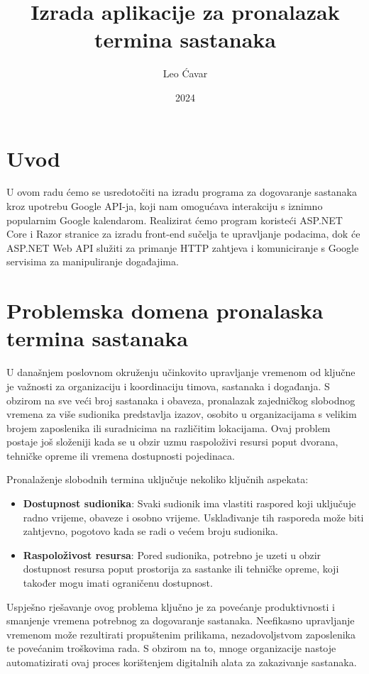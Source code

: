 \documentclass{foi}
\title{Izrada aplikacije za pronalazak termina sastanaka}
\author{Leo Ćavar}
\date{2024}
\begin{document}
\maketitle

\tableofcontents

\pagestyle{plain}
\chapter{Uvod}
U ovom radu ćemo se usredotočiti na izradu programa za dogovaranje sastanaka kroz upotrebu Google API-ja, koji nam omogućava interakciju s iznimno popularnim Google kalendarom. Realizirat ćemo program koristeći ASP.NET Core i Razor stranice za izradu front-end sučelja te upravljanje podacima, dok će ASP.NET Web API služiti za primanje HTTP zahtjeva i komuniciranje s Google servisima za manipuliranje događajima.
\chapter{Problemska domena pronalaska termina sastanaka}

U današnjem poslovnom okruženju učinkovito upravljanje vremenom od ključne je važnosti za organizaciju i koordinaciju timova, sastanaka i događanja. S obzirom na sve veći broj sastanaka i obaveza, pronalazak zajedničkog slobodnog vremena za više sudionika predstavlja izazov, osobito u organizacijama s velikim brojem zaposlenika ili suradnicima na različitim lokacijama. Ovaj problem postaje još složeniji kada se u obzir uzmu raspoloživi resursi poput dvorana, tehničke opreme ili vremena dostupnosti pojedinaca.

Pronalaženje slobodnih termina uključuje nekoliko ključnih aspekata:
\begin{itemize}
    \item \textbf{Dostupnost sudionika}: Svaki sudionik ima vlastiti raspored koji uključuje radno vrijeme, obaveze i osobno vrijeme. Usklađivanje tih rasporeda može biti zahtjevno, pogotovo kada se radi o većem broju sudionika.
    \item \textbf{Raspoloživost resursa}: Pored sudionika, potrebno je uzeti u obzir dostupnost resursa poput prostorija za sastanke ili tehničke opreme, koji također mogu imati ograničenu dostupnost.
\end{itemize}


Uspješno rješavanje ovog problema ključno je za povećanje produktivnosti i smanjenje vremena potrebnog za dogovaranje sastanaka. Neefikasno upravljanje vremenom može rezultirati propuštenim prilikama, nezadovoljstvom zaposlenika te povećanim troškovima rada. S obzirom na to, mnoge organizacije nastoje automatizirati ovaj proces korištenjem digitalnih alata za zakazivanje sastanaka.
\end{document}
